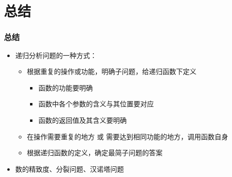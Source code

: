 \section{总结}

\begin{frame}[fragile]
    \frametitle{总结}
    
    \begin{itemize}
        \item 递归分析问题的一种方式：
        \begin{itemize}
            \item 根据重复的操作或功能，明确子问题，给递归函数下定义
            \begin{itemize}
                \item 函数的功能要明确
                \item 函数中各个参数的含义与其位置要对应
                \item 函数的返回值及其含义要明确
            \end{itemize}
            \item 在操作需要重复的地方 或 需要达到相同功能的地方，调用函数自身
            \item 根据递归函数的定义，确定最简子问题的答案
        \end{itemize}
        \item 数的精致度、分裂问题、汉诺塔问题
    \end{itemize}

\end{frame}

